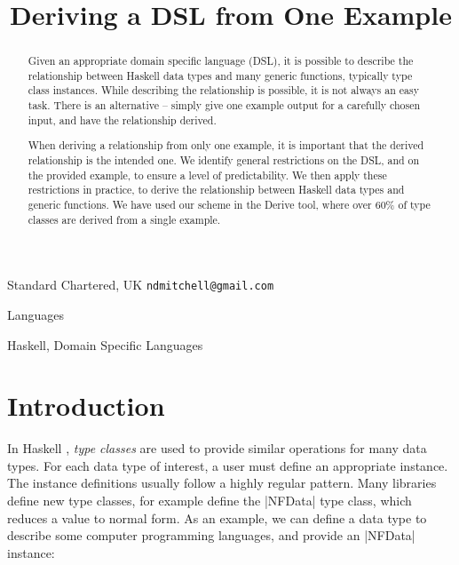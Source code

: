 \documentclass[preprint,draft]{sigplanconf}
\begin{document}
\copyrightdata{[to be supplied]}

\titlebanner{\today{} - \currenttime{}}        %
\preprintfooter{}   %

\title{Deriving a DSL from One Example}

           {Standard Chartered, UK}
           {\verb"ndmitchell@gmail.com"}

\maketitle


\begin{abstract}
Given an appropriate domain specific language (DSL), it is possible to describe the relationship between Haskell data types and many generic functions, typically type class instances. While describing the relationship is possible, it is not always an easy task. There is an alternative -- simply give one example output for a carefully chosen input, and have the relationship derived.

When deriving a relationship from only one example, it is important that the derived relationship is the intended one. We identify general restrictions on the DSL, and on the provided example, to ensure a level of predictability. We then apply these restrictions in practice, to derive the relationship between Haskell data types and generic functions. We have used our scheme in the Derive tool, where over 60\% of type classes are derived from a single example.
\end{abstract}


\terms
Languages

\keywords
Haskell, Domain Specific Languages

\section{Introduction}
\label{sec:introduction}

In Haskell \cite{haskell}, \textit{type classes} \cite{wadler:type_classes} are used to provide similar operations for many data types. For each data type of interest, a user must define an appropriate instance. The instance definitions usually follow a highly regular pattern. Many libraries define new type classes, for example \citet{trinder:strategies} define the |NFData| type class, which reduces a value to normal form. As an example, we can define a data type to describe some computer programming languages, and provide an |NFData| instance:
\end{document}
